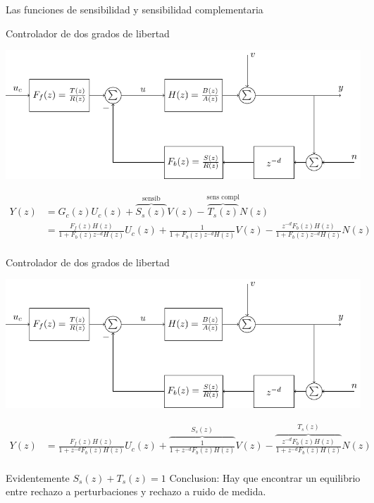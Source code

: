 \documentclass[presentation,aspectratio=169]{beamer}
\begin{document}
\begin{frame}[label={sec:orgbeb7484}]{Las funciones de sensibilidad y sensibilidad complementaria}
\end{frame}
\begin{frame}[label={sec:orgd1adca1}]{Controlador de dos grados de libertad}
\begin{center}
\includegraphics[width=0.8\linewidth]{../../figures/2dof-block-explicit}
\end{center}

\begin{align*}
Y(z) &= G_c(z)U_c(z) + \overbrace{S_s(z)}^{\text{sensib}}V(z) - \overbrace{T_s(z)}^{\text{sens compl}}N(z)\\
     &= \frac{F_f(z)H(z)}{1 + F_b(z)z^{-d}H(z)}U_c(z) + \frac{1}{1 + F_b(z)z^{-d}H(z)}V(z)  - \frac{z^{-d}F_b(z)H(z)}{1 + F_b(z)z^{-d}H(z)}N(z)\\
\end{align*}
\end{frame}

\begin{frame}[label={sec:orgd39eab0}]{Controlador de dos grados de libertad}
\begin{center}
\includegraphics[width=0.7\linewidth]{../../figures/2dof-block-explicit}
\end{center}

\begin{align*}
Y(z)     &= \frac{F_f(z)H(z)}{1 + z^{-d}F_b(z)H(z)}U_c(z) + \overbrace{\frac{1}{1 + z^{-d}F_b(z)H(z)}}^{S_s(z)}V(z)  - \overbrace{\frac{z^{-d}F_b(z)H(z)}{1 + z^{-d}F_b(z)H(z)}}^{T_s(z)}N(z)\\
\end{align*}

\alert{Evidentemente} \(S_s(z) + T_s(z) = 1\) \alert{Conclusion:} Hay que encontrar un equilibrio entre rechazo a perturbaciones y rechazo a ruido de medida.
\end{frame}
\end{document}
